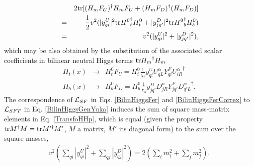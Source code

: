 \documentclass[12pt]{article}
\renewcommand\[{\begin{dmath}}
\renewcommand\]{\end{dmath}}
\begin{document}
 \begin{eqnarray}
\label  {TransfoHHp}  & & 2 {\rm tr}  [ (  H_m F_U    )  ^\dagger     H_m  F_U+    (H_m F_D)^\dagger (  H_m F_D    )  ]
\\ \nonumber
 &=  &  \frac{1}{2}  v^2(  |y^U_{qi}|^2   {\rm tr}  {  H^0  }^\dagger_{t}  {   H }^0_{t} +
  |y^D_{jq'}|^2    {\rm tr} {   H^0  } ^\dagger_{b}   {    H  }^0_{b}) \\ \nonumber
   &= &v^2(|y^U_{qi}|^2    +
   |y^D_{jq'}|^2 ),    \end{eqnarray}
   which may be also obtained by the substitution of the associated scalar coefficients in   bilinear neutral Higgs terms
      $ {\rm tr}      {   H_m } ^\dagger {   H_m}$
 \begin{eqnarray}\label  {TransfoHFer}
  {    H}_{t}(x)&\rightarrow &{   H}^0_{t}    F_U ={   H}^0_{t}  \frac{1}{\chi_t} y^U_{qi}  U^\alpha_{qL}  Y^F_{qi}  {  U_{iR}^\alpha}^\dagger \\ \nonumber
 {   H}_{b}(x)&\rightarrow  & {   H}^0_{b}   F_D = {   H}^0_{b}   \frac{1}{\chi_b} y^D_{jq'}  D^\alpha_{jR}  Y^F_{jq'}   { D_{q'L}^\alpha}^\dagger. \end{eqnarray}
   The correspondence of ${\cal L } _{SF}$  in  Eqs.  \ref{BilinHiggsFer} and  \ref{BilinHiggsFerCorrex} to ${\cal L}_{SFT}$ in    Eq. \ref{BilinHiggsGenYuka}   induces the sum of  square mass-matrix elements in Eq. \ref {TransfoHHp}, which is equal  (given the property ${\rm tr} M^{\dagger} M ={\rm tr} M^{\prime\dagger} M'$, $M$ a matrix, $M'$ its diagonal form) to the  sum over the        square masses, \begin{eqnarray}
\label  {MassSumRuleGen}       v^2 (\sum_{qi}   |y^U_{qi}|^2 +    \sum_{qj}
    |y^D_{qj}|^2 )  = 2(\sum_{i}m _i^2+\sum_{j}m _j^2)   .  \end{eqnarray}
\end{document}

